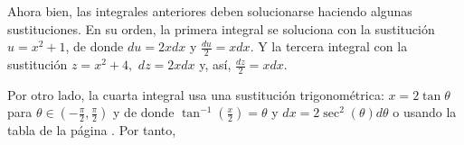 

Ahora bien, las integrales anteriores deben solucionarse haciendo algunas sustituciones. En su orden, la primera integral se soluciona con la sustitución $u=x^{2}+1$, de donde $du=2xdx$ y $\frac{du}{2}=xdx$. Y la tercera integral con la sustitución $z=x^{2}+4,$ $dz=2xdx$ y, así, $\frac{dz}{2}=xdx$.

Por otro lado, la cuarta integral usa una sustitución trigonométrica: $x=2\tan \theta $ para $\theta \in \left( -\frac{\pi }{2},\frac{\pi }{2}\right)$ y de donde $\tan ^{-1}\left( \frac{x}{2}\right) =\theta $ y
$dx=2\sec ^{2}\left( \theta \right) d\theta $ o usando la tabla de la página \pageref{TablaIntegrales}.
Por tanto,



